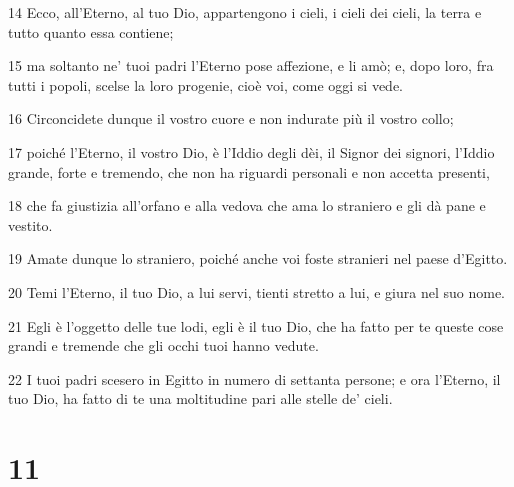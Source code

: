 \par 14 Ecco, all'Eterno, al tuo Dio, appartengono i cieli, i cieli dei cieli, la terra e tutto quanto essa contiene;
\par 15 ma soltanto ne' tuoi padri l'Eterno pose affezione, e li amò; e, dopo loro, fra tutti i popoli, scelse la loro progenie, cioè voi, come oggi si vede.
\par 16 Circoncidete dunque il vostro cuore e non indurate più il vostro collo;
\par 17 poiché l'Eterno, il vostro Dio, è l'Iddio degli dèi, il Signor dei signori, l'Iddio grande, forte e tremendo, che non ha riguardi personali e non accetta presenti,
\par 18 che fa giustizia all'orfano e alla vedova che ama lo straniero e gli dà pane e vestito.
\par 19 Amate dunque lo straniero, poiché anche voi foste stranieri nel paese d'Egitto.
\par 20 Temi l'Eterno, il tuo Dio, a lui servi, tienti stretto a lui, e giura nel suo nome.
\par 21 Egli è l'oggetto delle tue lodi, egli è il tuo Dio, che ha fatto per te queste cose grandi e tremende che gli occhi tuoi hanno vedute.
\par 22 I tuoi padri scesero in Egitto in numero di settanta persone; e ora l'Eterno, il tuo Dio, ha fatto di te una moltitudine pari alle stelle de' cieli.

\chapter{11}

